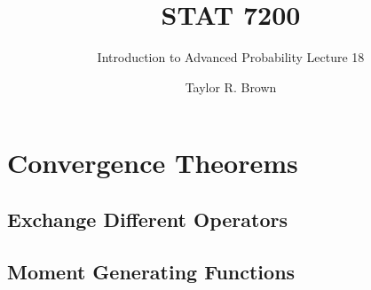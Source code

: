 \documentclass[handout]{beamer}
\title{STAT 7200}
\subtitle{Introduction to Advanced Probability \newline Lecture 18}
\author{Taylor R. Brown}
\institute{}
\date{}
\begin{document}
\frame{\titlepage}


\section[Outline]{}
\frame{\tableofcontents}





% 
% 




\section{Convergence Theorems}




\subsection{Exchange Different Operators}

\subsection{Moment Generating Functions}
\end{document}
